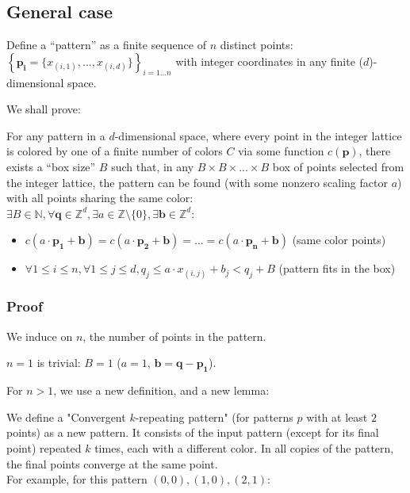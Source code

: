\documentclass[11pt]{article}
\newcommand{\N}{\mathbb{N}}
\newcommand{\Z}{\mathbb{Z}}
\newcommand*{\scalePic}{0.4}
\newcommand*{\gridArg}[7]{%
    \foreach \x in {\fpeval{#1},\fpeval{#1+#2},...,\fpeval{#3+0.0001}} %
        \draw [black, thin, #7] (\x,\fpeval{#4}) -- (\x,\fpeval{#6+0.0001});
    \foreach \y in {\fpeval{#4},\fpeval{#4+#5},...,\fpeval{#6+0.0001}}
        \draw [black, thin, #7] (\fpeval{#1},\y) -- (\fpeval{#3+0.0001},\y);
}
\newcommand*{\grid}[6]{\gridArg{#1}{#2}{#3}{#4}{#5}{#6}{}}%
\newcommand*{\mybigbox}[4]{\grid{#1}{#3}{#1+#3}{#2}{#4}{#2+#4}} %
\newcommand*{\point}[3]{\node at (#1 + 0.5, #2 + 0.5)[circle, fill, inner sep=\scalePic*5pt, #3]{}; \gridArg{#1}{1}{#1+1}{#2}{1}{#2+1}{draw=none}}
\newcommand*{\blue}{blue!60!green}
\begin{document}
\pagebreak
\subsection*{General case}

Define a ``pattern'' as a finite sequence of $n$ distinct points:\\
$\left\{\mathbf{p_i} = \{x_{(i,1)}, ..., x_{(i,d)}\}\right\}_{i=1...n}$ with integer coordinates in any finite ($d$)-dimensional space.

We shall prove:

For any pattern in a $d$-dimensional space, where every point in the integer lattice is colored by one of a finite number of colors $C$ via some function $c(\mathbf{p})$, there exists a ``box size'' $B$ such that, in any $B \times B \times ... \times B$ box of points selected from the integer lattice, the pattern can be found (with some nonzero scaling factor $a$) with all points sharing the same color:\\
$\exists B \in \N, \forall \mathbf{q} \in \Z^{d}, \exists a \in \Z \setminus \{ 0 \}, \exists \mathbf{b} \in \Z^{d}$:
\begin{itemize}
\item $c(a \cdot \mathbf{p_1} + \mathbf{b}) = c(a \cdot \mathbf{p_2} + \mathbf{b}) = ... = c(a \cdot \mathbf{p_n} + \mathbf{b})$ (same color points)
\item $\forall 1 \leq i \leq n, \forall 1 \leq j \leq d, q_j \leq a \cdot x_{(i,j)} + b_j < q_j + B$ (pattern fits in the box)
\end{itemize}


\subsubsection*{Proof}
We induce on $n$, the number of points in the pattern.

$n=1$ is trivial: $B=1$ ($a=1$, $\mathbf{b} = \mathbf{q} - \mathbf{p_1}$).

For $n>1$, we use a new definition, and a new lemma:

We define a "Convergent $k$-repeating pattern" (for patterns $p$ with at least $2$ points) as a new pattern. It consists of the input pattern (except for its final point) repeated $k$ times, each with a different color. In all copies of the pattern, the final points converge at the same point.\\
For example, for this pattern $(0,0), (1,0), (2,1)$:
\end{document}
